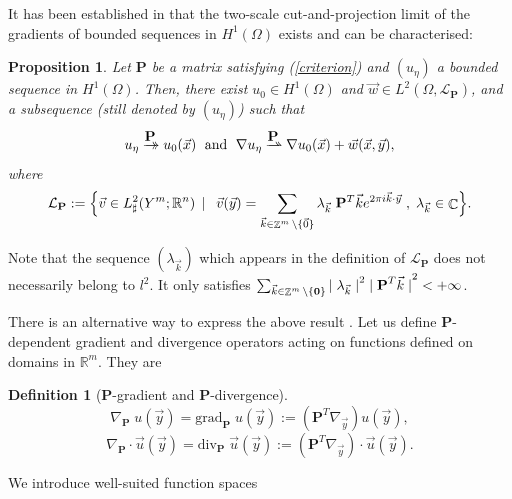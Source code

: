 \documentclass[a4paper,reqno]{amsart}
\numberwithin{equation}{section}
\numberwithin{equation}{section}		%
\numberwithin{figure}{section}			%
\numberwithin{table}{section}				%
\newcommand{\R}{\mathbb{R}}
\newtheorem{proposition}[theorem]{Proposition}
\theoremstyle{definition}
\newtheorem{definition}[theorem]{Definition}
\DeclareMathOperator{\Z}{\mathbb{Z}}
\DeclareMathOperator{\C}{\mathbb{C}}
\newcommand{\<}{\ensuremath \leq}
\renewcommand{\>}{\ensuremath \geq}
\def\e{\eta}
\def\ue{u_\e}
\def\xy{(\vec{x},\vec{y})}
\def\wdto{\buildrel\hbox{$\textbf{P}$}\over
\rightharpoonup \!\!\!\!\! \rightharpoonup}
\def\dto{\buildrel\hbox{$\textbf{P}$}\over
\to \!\!\!\!\! \to}
\def\O{\Omega}
\begin{document}
It has been established in \cite[Proposition~2.13]{Bouchitte+etal2010} that the two-scale
cut-and-projection limit of the gradients of bounded sequences in $H^{1}(\O)$ exists and can be characterised:
\begin{proposition}\label{prop:gradtwoscale}
Let $\textbf{P}$ be a matrix satisfying (\ref{criterion}) and $(\ue)$ a
bounded sequence in $H^{1}(\O)$. Then, there exist $u_0 \in H^{1}(\O)$ and $ \vec{w} \in L^2(\O,{\mathcal L}_\textbf{P})$, and a subsequence (still denoted by $(\ue)$) such that 
\begin{equation*}
\ue\dto u_0(\vec{x}) \;  \mbox{ and } \; \nabla\ue\wdto\nabla u_0(\vec{x}) +  \vec{w} \xy,
\end{equation*}
where
\begin{equation*}
{\mathcal L}_\textbf{P} := \Bigl \{
 \vec{v} \in L^2_{\sharp}(Y^m; \R^n) \,\mid\,\  \vec{v}(\vec{y}) = \sum_{\vec{k}\in \Z^m \setminus \{\vec{0}\}} \lambda_{\vec{k}} \; {\bf
P}^T\vec{k} e^{2\pi i \vec{k} \cdot \vec{y}} \; , \; \lambda_{\vec{k}} \in \C \Bigr \}. %
\end{equation*}
\end{proposition}
Note that the sequence $(\lambda_{\vec{k}})$ which appears in the definition of
${\mathcal L}_{\textbf{P}}$ does not necessarily belong to $l^2$. It only satisfies
$\sum_{\vec{k}\in\Z^m\setminus\{{\bf 0}\}} {\mid\lambda_{\vec{k}}\mid}^2 \; {\mid \textbf{P}^T\vec{k}\mid}^2 < +\infty
$. 

There is an alternative way to express the above result \cite{wellander2018two}. Let us define $\textbf{P}$-dependent gradient and divergence operators acting on functions defined on domains in $\R^m$. They are
\begin{definition}[\textbf{P}-gradient and \textbf{P}-divergence]\label{def:R-differetnialoperators}
\begin{equation*}
 \nabla_\textbf{P}\;u(\vec{y}) =
 \mathrm{grad}_\textbf{P}\;u(\vec{y}) :=
 \left({\mathbf P}^T \nabla_{\vec{y}}\right)  u(\vec{y}),
\end{equation*}
\begin{equation*}
\nabla_\textbf{P}\cdot \vec{u}(\vec{y}) =
\mathrm{div}_\textbf{P}\;\vec{u}(\vec{y}) :=
\left(\textbf{P}^T \nabla_{\vec{y}}\right) \cdot \vec{u}(\vec{y}).
\end{equation*}
\end{definition}

We introduce well-suited function spaces
\end{document}
